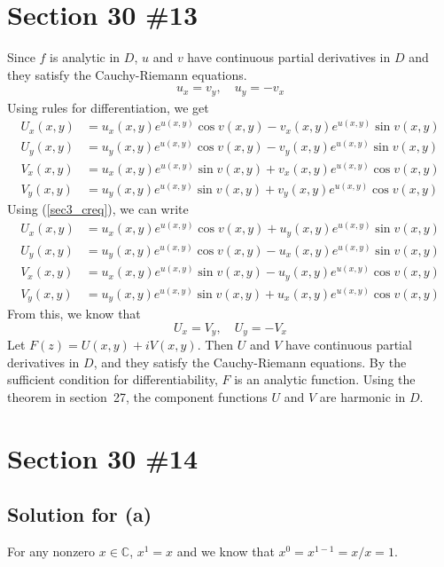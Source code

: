 \documentclass{scrartcl}
\begin{document}
\section{Section 30 \#13}
Since \(f\) is analytic in \(D\), \(u\) and \(v\) have continuous partial derivatives in \(D\) and they satisfy the Cauchy-Riemann equations.
\begin{align}\label{sec3_creq}
  u_x = v_y, \quad u_y = -v_x
\end{align}
Using rules for differentiation, we get
\begin{align*}
  U_x(x, y) &= u_x(x, y) e^{u(x, y)} \cos v(x, y) - v_x(x, y) e^{u(x, y)} \sin v(x, y) \\
  U_y(x, y) &= u_y(x, y) e^{u(x, y)} \cos v(x, y) - v_y(x, y) e^{u(x, y)} \sin v(x, y) \\
  V_x(x, y) &= u_x(x, y) e^{u(x, y)} \sin v(x, y) + v_x(x, y) e^{u(x, y)} \cos v(x, y) \\
  V_y(x, y) &= u_y(x, y) e^{u(x, y)} \sin v(x, y) + v_y(x, y) e^{u(x, y)} \cos v(x, y)
\end{align*}
Using (\ref{sec3_creq}), we can write
\begin{align*}
  U_x(x, y) &= u_x(x, y) e^{u(x, y)} \cos v(x, y) + u_y(x, y) e^{u(x, y)} \sin v(x, y) \\
  U_y(x, y) &= u_y(x, y) e^{u(x, y)} \cos v(x, y) - u_x(x, y) e^{u(x, y)} \sin v(x, y) \\
  V_x(x, y) &= u_x(x, y) e^{u(x, y)} \sin v(x, y) - u_y(x, y) e^{u(x, y)} \cos v(x, y) \\
  V_y(x, y) &= u_y(x, y) e^{u(x, y)} \sin v(x, y) + u_x(x, y) e^{u(x, y)} \cos v(x, y)
\end{align*}
From this, we know that
\[
  U_x = V_y, \quad U_y = -V_x
\]
Let \(F(z) = U(x, y) + iV(x, y)\).
Then \(U\) and \(V\) have continuous partial derivatives in \(D\), and they satisfy the Cauchy-Riemann equations.
By the sufficient condition for differentiability, \(F\) is an analytic function.
Using the theorem in section~27, the component functions \(U\) and \(V\) are harmonic in \(D\).

\section{Section 30 \#14}
\subsection{Solution for (a)}
For any nonzero \(x \in \mathbb{C}\), \(x^1 = x\) and we know that \(x^0 = x^{1 - 1} = x / x = 1\).
\end{document}

